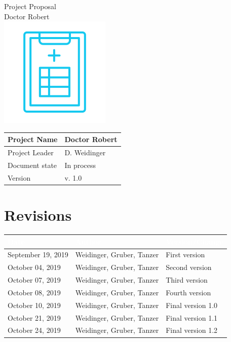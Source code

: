 \documentclass[12pt]{article}
\theoremstyle{definition}
\newcommand{\projectname}{Doctor Robert}
\newcommand{\productname}{Doctor Robert}
\newcommand{\projectleader}{D. Weidinger}
\newcommand{\documentstatus}{In process}
\newcommand{\version}{v. 1.0}
\begin{document}
\begin{titlepage}
\begin{flushright}
\end{flushright}

\vspace{10em}

\begin{center}
{\Huge Project Proposal} \\[3em]
{\LARGE \productname} \\[3em]
\includegraphics[scale=.5]{logo.png}\\
\end{center}

\vspace{10em}

\begin{flushleft}
\begin{tabular}{|l|l|}
\hline
Project Name & \projectname \\ \hline
Project Leader & \projectleader \\ \hline
Document state & \documentstatus \\ \hline
Version & \version \\ \hline
\end{tabular}
\end{flushleft}

\end{titlepage}


\section*{Revisions}
\begin{tabular}{|l|l|l|}
\hline
\cellcolor[gray]{0.5}\textcolor{white}{Date} & \cellcolor[gray]{0.5}\textcolor{white}{Author} & \cellcolor[gray]{0.5}\textcolor{white}{Version/Change} \\ \hline
September 19, 2019&Weidinger, Gruber, Tanzer&First version \\ \hline
October 04, 2019&Weidinger, Gruber, Tanzer&Second version \\ \hline
October 07, 2019&Weidinger, Gruber, Tanzer&Third version \\ \hline
October 08, 2019&Weidinger, Gruber, Tanzer&Fourth version \\ \hline
October 10, 2019&Weidinger, Gruber, Tanzer&Final version 1.0 \\ \hline
October 21, 2019&Weidinger, Gruber, Tanzer&Final version 1.1 \\ \hline
October 24, 2019&Weidinger, Gruber, Tanzer&Final version 1.2 \\ \hline
\end{tabular}
\end{document}

